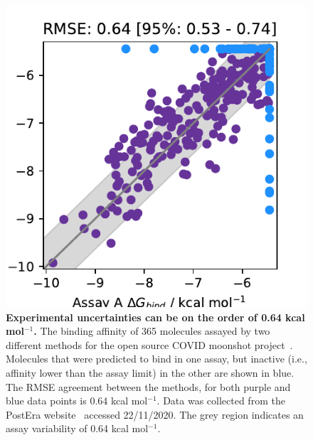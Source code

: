 \documentclass[9pt,bestpractices]{livecoms}
\begin{document}
\begin{figure}
    \centering
    \includegraphics[width=0.95\linewidth]{figures/reporting/moonshot-assays.pdf}
    \caption{\textbf{Experimental uncertainties can be on the order of 0.64 kcal mol$^{-1}$.} The binding affinity of 365 molecules assayed by two different methods for the open source COVID moonshot project~\cite{achdout2020covid}. Molecules that were predicted to bind in one assay, but inactive (i.e., affinity lower than the assay limit) in the other are shown in blue. The RMSE agreement between the methods, for both purple and blue data points is 0.64 kcal mol$^{-1}$. Data was collected from the PostEra website~\cite{posteracovid} accessed 22/11/2020. The grey region indicates an assay variability of 0.64 kcal mol$^{-1}$.}
    \label{fig:expt_agreement}
\end{figure}
\end{document}
